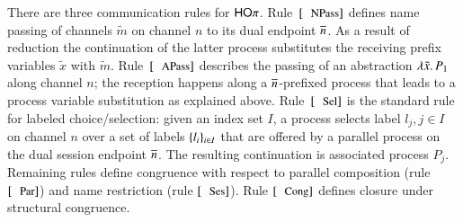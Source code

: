 

There are three communication rules for $\mathsf{HO}\pi$. 
Rule~$\orule{NPass}$ defines name passing 
of channels $\tilde{m}$ on channel $n$ to its dual endpoint $\overline{n}$.
As a result of reduction the continuation of the 
latter process substitutes the receiving prefix variables $\tilde{x}$
with $\tilde{m}$.
Rule~$\orule{APass}$ describes
the passing of an abstraction $\lambda \tilde{x}.\,P_1$
along channel $n$;
the reception happens along a $\overline{n}$-prefixed process that
leads to a process variable substitution as explained above.
Rule~$\orule{Sel}$ is the standard rule for labeled choice/selection:
given an index set $I$, 
a process selects label $l_j, j \in I$ on channel $n$ over a set of
labels $\{l_i\}_{i \in I}$ that are offered by a parallel process
on the dual session endpoint $\overline{n}$.
The resulting continuation is associated process $P_j$.
Remaining rules define congruence 
with respect to parallel composition (rule $\orule{Par}$)
and name restriction (rule $\orule{Ses}$).
Rule $\orule{Cong}$ defines closure under structural congruence.



